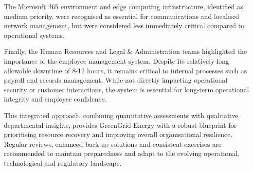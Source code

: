 The Microsoft 365 environment and edge computing infrastructure, identified as medium priority, were recognised as essential for communications and localised network management, but were considered less immediately critical compared to operational systems.

Finally, the Human Resources and Legal \& Administration teams highlighted the importance of the employee management system. Despite its relatively long allowable downtime of 8-12 hours, it remains critical to internal processes such as payroll and records management. While not directly impacting operational security or customer interactions, the system is essential for long-term operational integrity and employee confidence.

This integrated approach, combining quantitative assessments with qualitative departmental insights, provides GreenGrid Energy with a robust blueprint for prioritising resource recovery and improving overall organisational resilience. Regular reviews, enhanced back-up solutions and consistent exercises are recommended to maintain preparedness and adapt to the evolving operational, technological and regulatory landscape.
